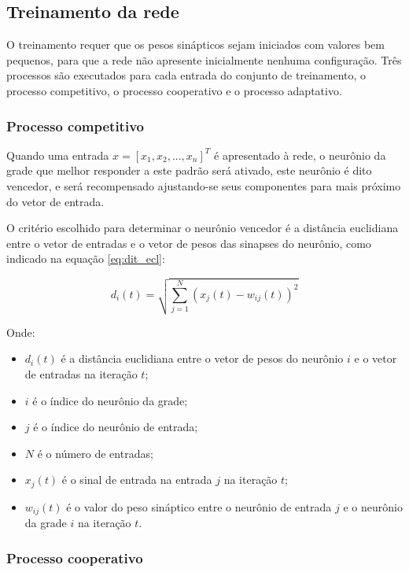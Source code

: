 \subsection{Treinamento da rede}

O treinamento requer que os pesos sinápticos sejam iniciados com valores bem
pequenos, para que a rede não apresente inicialmente nenhuma configuração. Três
processos são executados para cada entrada do conjunto de treinamento, o
processo competitivo, o processo cooperativo e o processo adaptativo.

\subsubsection{Processo competitivo}

Quando uma entrada $ x = \left[x_1, x_2, ..., x_n\right]^T $ é apresentado à
rede, o neurônio da grade que melhor responder a este padrão será ativado, este
neurônio é dito vencedor, e será recompensado ajustando-se seus componentes
para mais próximo do vetor de entrada.

O critério escolhido para determinar o neurônio vencedor é a distância
euclidiana entre o vetor de entradas e o vetor de pesos das sinapses do
neurônio, como indicado na equação \ref{eq:dit_ecl}:

\begin{equation}\label{eq:dit_ecl}
d_i(t) = \sqrt{\sum_{j = 1}^N \left( x_j(t) - w_{ij}(t) \right)^2}
\end{equation}

Onde:

\begin{itemize}
\item $ d_i(t) $ é a distância euclidiana entre o vetor de pesos do
neurônio $ i $ e o vetor de entradas na iteração $ t $;
\item $ i $ é o índice do neurônio da grade;
\item $ j $ é o índice do neurônio de entrada;
\item $ N $ é o número de entradas;
\item $ x_j(t) $ é o sinal de entrada na entrada $ j $ na iteração $ t $;
\item $ w_{ij}(t) $ é o valor do peso sináptico entre o neurônio de
entrada $ j $ e o neurônio da grade $ i $ na iteração $ t $.
\end{itemize}

\subsubsection{Processo cooperativo}

